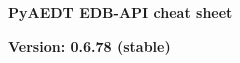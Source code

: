 \documentclass[landscape]{article}
\begin{document}
\raggedright
\footnotesize
\begin{center}
     \Huge{\textbf{PyAEDT EDB-API cheat sheet}} \\
\end{center}
\begin{center}
\small{\textbf{Version: 0.6.78 (stable)}} \\
\end{center}
\vspace{-0.15cm}
\noindent\makebox[\linewidth]{\rule{\paperwidth}{2pt}}
\end{document}
